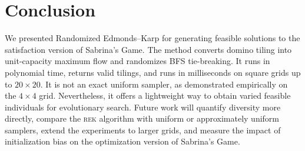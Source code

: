 \documentclass[svgnames,table,runningheads]{llncs}
\newcommand{\rek}{\textsc{rek}\xspace}
\begin{document}
\section{Conclusion}
\label{sec:conclusion}
We presented Randomized Edmonds--Karp for generating feasible solutions to the satisfaction version of Sabrina's Game. The method converts domino tiling into unit-capacity maximum flow and randomizes BFS tie-breaking. It runs in polynomial time, returns valid tilings, and runs in milliseconds on square grids up to $20\times20$. It is not an exact uniform sampler, as demonstrated empirically on the $4\times4$ grid. Nevertheless, it offers a lightweight way to obtain varied feasible individuals for evolutionary search. Future work will quantify diversity more directly, compare the \rek algorithm with uniform or approximately uniform samplers, extend the experiments to larger grids, and measure the impact of initialization bias on the optimization version of Sabrina's Game.



\end{document}
